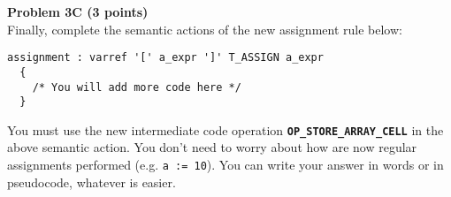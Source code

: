 \pagebreak

{\bf Problem 3C (3 points)}
\\
Finally, complete the semantic actions of the new assignment rule  below:

\begin{lstlisting}
assignment : varref '[' a_expr ']' T_ASSIGN a_expr 
  {
    /* You will add more code here */ 
  }
\end{lstlisting}

You must use the new intermediate code operation
{\bf \texttt{OP\_STORE\_ARRAY\_CELL}} in the above semantic action. You don't need to worry
about how are now regular assignments performed (e.g. \texttt{a := 10}).
You can write your answer in words or in pseudocode, whatever is easier.

\begin{tcolorbox}[height=6in]

\end{tcolorbox}

